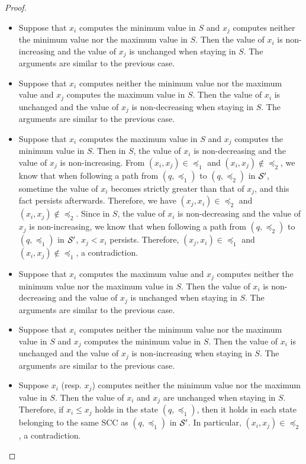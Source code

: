 \begin{appendix}
\begin{proof}
\begin{itemize}
%
\item Suppose that $x_i$ computes the minimum value in $S$ and $x_j$ computes neither the minimum value nor the maximum value in $S$. Then the value of $x_i$ is non-increasing and the value of $x_j$ is unchanged when staying in $S$. The arguments are similar to the previous case.
%
\item Suppose that $x_i$ computes neither the minimum value nor the maximum value and $x_j$ computes the maximum value in $S$. Then the value of $x_i$ is unchanged and the value of $x_j$ is non-decreasing when staying in $S$. The arguments are similar to the previous case.
%
\item Suppose that $x_i$ computes the maximum value in $S$ and $x_j$ computes the minimum value in $S$.  Then in $S$, the value of $x_i$ is non-decreasing and the value of $x_j$ is non-increasing.  From $(x_i, x_j) \in \preceq_1$ and $(x_i, x_j) \not \in \preceq_2$, we know that when following a path from $(q, \preceq_1)$ to $(q, \preceq_2)$ in ${\mathcal{S} }'$, sometime the value of $x_i$ becomes strictly greater than that of $x_j$, and this fact persists afterwards. Therefore, we have $(x_j, x_i) \in \preceq_2$ and $(x_i, x_j) \not \in \preceq_2$. Since in $S$, the value of $x_i$ is non-decreasing and the value of $x_j$ is non-increasing, we know that when following a path from $(q, \preceq_2)$ to $(q, \preceq_1)$ in ${\mathcal{S} }'$, $x_j < x_i$ persists. Therefore, $(x_j, x_i) \in \preceq_1$ and $(x_i, x_j) \not \in \preceq_1$, a contradiction.
%
\item Suppose that $x_i$ computes the maximum value and  $x_j$ computes neither the minimum value nor the maximum value in $S$. Then the value of $x_i$ is non-decreasing and the value of $x_j$ is unchanged when staying in $S$. The arguments are similar to the previous case.
%
\item Suppose that $x_i$ computes neither the minimum value nor the maximum value in $S$ and $x_j$ computes the minimum value in $S$. Then the value of $x_i$ is unchanged and the value of $x_j$ is non-increasing when staying in $S$. The arguments are similar to the previous case.
%
\item Suppose $x_i$ (resp. $x_j$) computes neither  the minimum value nor the maximum value in $S$. Then the value of $x_i$ and $x_j$ are unchanged when staying in $S$. Therefore, if $x_i \le x_j$ holds in the state $(q, \preceq_1)$, then it holds in each state belonging to the same SCC as $(q, \preceq_1)$ in ${\mathcal{S} }'$. In particular, $(x_i, x_j) \in \preceq_2$, a contradiction.
\end{itemize}

\end{proof}
\end{appendix}
